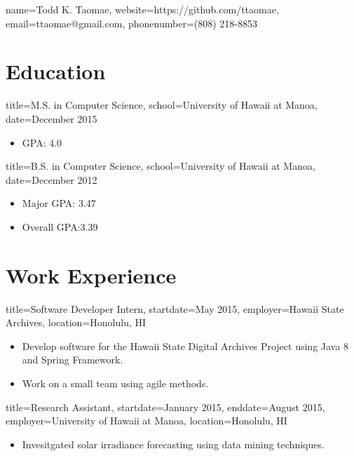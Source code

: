 \documentclass{resume}
\begin{document}
\begin{header}{name=Todd K. Taomae,
            website=https://github.com/ttaomae,
            email=ttaomae@gmail.com,
            phonenumber=(808) 218-8853}
\end{header}

\section*{Education}
\begin{degree}{title=M.S. in Computer Science,
               school=University of Hawaii at Manoa,
               date=December 2015}
    \begin{itemize}
        \item{GPA: 4.0}
    \end{itemize}
\end{degree}

\begin{degree}{title=B.S. in Computer Science,
               school=University of Hawaii at Manoa,
               date=December 2012}
    \begin{itemize}
        \item{Major GPA: 3.47}
        \item{Overall GPA:3.39}
    \end{itemize}
\end{degree}

\section*{Work Experience}
\begin{job}{title=Software Developer Intern,
            startdate=May 2015,
            employer=Hawaii State Archives,
            location={Honolulu, HI}}
    \begin{itemize}
        \item{Develop software for the Hawaii State Digital Archives Project using Java 8 and Spring Framework.}
        \item{Work on a small team using agile methods.}
    \end{itemize}
\end{job}

\begin{job}{title=Research Assistant,
            startdate=January 2015,
            enddate=August 2015,
            employer=University of Hawaii at Manoa,
            location={Honolulu, HI}}
    \begin{itemize}
        \item{Invesitgated solar irradiance forecasting using data mining techniques.}
    \end{itemize}
\end{job}
\end{document}

